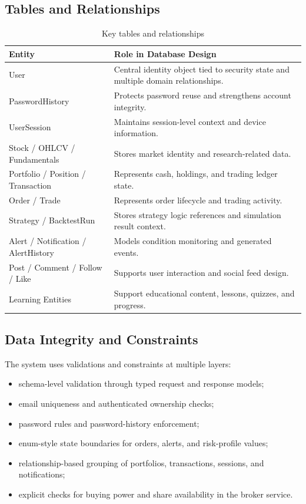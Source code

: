 \documentclass[12pt,a4paper]{report}
\begin{document}
\subsection{Tables and Relationships}
\begin{table}[H]
\centering
\caption{Key tables and relationships}
\begin{tabularx}{\textwidth}{>{\raggedright\arraybackslash}p{2.1in} X}
\toprule
\textbf{Entity} & \textbf{Role in Database Design} \\
\midrule
User & Central identity object tied to security state and multiple domain relationships. \\
PasswordHistory & Protects password reuse and strengthens account integrity. \\
UserSession & Maintains session-level context and device information. \\
Stock / OHLCV / Fundamentals & Stores market identity and research-related data. \\
Portfolio / Position / Transaction & Represents cash, holdings, and trading ledger state. \\
Order / Trade & Represents order lifecycle and trading activity. \\
Strategy / BacktestRun & Stores strategy logic references and simulation result context. \\
Alert / Notification / AlertHistory & Models condition monitoring and generated events. \\
Post / Comment / Follow / Like & Supports user interaction and social feed design. \\
Learning Entities & Support educational content, lessons, quizzes, and progress. \\
\bottomrule
\end{tabularx}
\end{table}

\subsection{Data Integrity and Constraints}
The system uses validations and constraints at multiple layers:
\begin{itemize}
\item schema-level validation through typed request and response models;
\item email uniqueness and authenticated ownership checks;
\item password rules and password-history enforcement;
\item enum-style state boundaries for orders, alerts, and risk-profile values;
\item relationship-based grouping of portfolios, transactions, sessions, and notifications;
\item explicit checks for buying power and share availability in the broker service.
\end{itemize}
\end{document}
